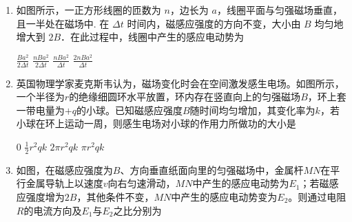 


\begin{enumerate}
\renewcommand{\labelenumi}{\arabic{enumi}.}
\item
{}
如图所示，一正方形线圈的匝数为 $ n $，边长为 $ a $，线圈平面与匀强磁场垂直，且一半处在磁场中. 在 $ \Delta t $ 时间内，磁感应强度的方向不变，大小由 $ B $ 均匀地增大到 $ 2 B $．在此过程中，线圈中产生的感应电动势为  

\begin{minipage}[h!]{0.7\linewidth}
\vspace{0.3em}
\fourchoices
{$ \frac { B a ^ { 2 } } { 2 \Delta t } $}
{$ \frac { n B a ^ { 2 } } { 2 \Delta t } $}
{$ \frac { n B a ^ { 2 } } { \Delta t } $}
{$ \frac { 2 n B a ^ { 2 } } { \Delta t } $}

\vspace{0.3em}
\end{minipage}
\hfill
\begin{minipage}[h!]{0.3\linewidth}
\flushright
\vspace{0.3em}

\vspace{0.3em}
\end{minipage}






\item 
{}
英国物理学家麦克斯韦认为，磁场变化时会在空间激发感生电场。如图所示，一个半径为$ r $的绝缘细圆环水平放置，环内存在竖直向上的匀强磁场$ B $，环上套一带电量为$ +q $的小球。已知磁感应强度$ B $随时间均匀增加，其变化率为$ k $，若小球在环上运动一周，则感生电场对小球的作用力所做功的大小是  

\begin{figure}[h!]
\centering

\end{figure}


\fourchoices
{$ 0 $}
{$ \frac { 1 } { 2 } r ^ { 2 } q k $}
{$ 2 \pi r ^ { 2 } q k $}
{$ \pi r ^ { 2 } q k $}








\item 
{}
如图，在磁感应强度为$ B $、方向垂直纸面向里的匀强磁场中，金属杆$ MN $在平行金属导轨上以速度$ v $向右匀速滑动，$ MN $中产生的感应电动势为$ E_1 $；若磁感应强度增为$ 2B $，其他条件不变，$ MN $中产生的感应电动势变为$ E_{2} $。则通过电阻$ R $的电流方向及$ E_{1} $与$ E_{2} $之比分别为  
\begin{figure}[h!]
\centering

\end{figure}


\end{enumerate}
